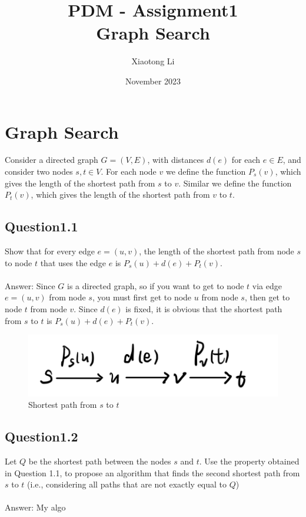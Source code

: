 \documentclass{article}
\title{\textbf{PDM - Assignment1\\}  Graph Search}
\author{Xiaotong Li\qquad 5965373}
\date{November 2023}
\begin{document}
    
    \begin{titlepage}
        \maketitle
    \end{titlepage}
    
    \tableofcontents
    \newpage
    
    \section{Graph Search}
    Consider a directed graph $G = (V, E)$, with distances $d(e)$ for each $e \in E$, and consider two nodes $s, t \in V$. For each node $v$ we define the function $P_s(v)$, which gives the length of the shortest path from $s$ to $v$. Similar we define the function $P_t(v)$, which gives the length of the shortest path from $v$ to $t$.
        \subsection{Question1.1}
        Show that for every edge $e = (u, v)$, the length of the shortest path from node $s$ to node $t$ that uses the edge $e$ is $P_s(u) + d(e) + P_t(v)$.\\\\
        Answer: Since $G$ is a directed graph, so if you want to get to node $t$ via edge $e=(u,v)$ from node $s$, you must first get to node $u$ from node $s$, then get to node $t$ from node $v$. Since $d(e)$ is fixed, it is obvious that the shortest path from $s$ to $t$ is $P_s(u) + d(e) + P_t(v)$.
        \begin{figure}[H]
            \centering
            \includegraphics[width=0.5\linewidth]{IMG_EE8351B44859-1.jpeg}
            \caption{Shortest path from $s$ to $t$}
            \label{fig1.1:Shortest path from $s$ to $t$}
        \end{figure}
        \subsection{Question1.2}
        Let $Q$ be the shortest path between the nodes $s$ and $t$. Use the property obtained in Question 1.1, to propose an algorithm that finds the second shortest path from $s$ to $t$ (i.e., considering all paths that are not exactly equal to $Q$)\\\\
        Answer: My algo
    \newpage
    
\end{document}
